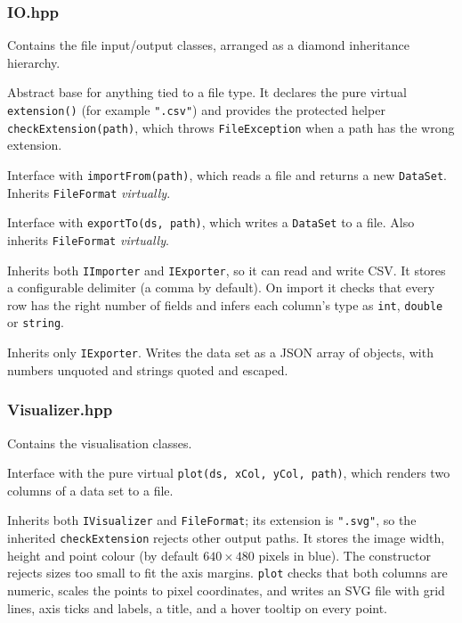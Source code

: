 \documentclass[11pt,a4paper]{article}
\newcommand{\code}[1]{\texttt{#1}}
\begin{document}
\subsubsection*{IO.hpp}

Contains the file input/output classes, arranged as a diamond inheritance hierarchy.

\begin{description}[noitemsep,leftmargin=1.5em]
  \item[\code{FileFormat}] Abstract base for anything tied to a file type. It declares the pure
    virtual \code{extension()} (for example \code{".csv"}) and provides the protected helper
    \code{checkExtension(path)}, which throws \code{FileException} when a path has the wrong
    extension.
  \item[\code{IImporter}] Interface with \code{importFrom(path)}, which reads a file and returns a
    new \code{DataSet}. Inherits \code{FileFormat} \emph{virtually}.
  \item[\code{IExporter}] Interface with \code{exportTo(ds, path)}, which writes a \code{DataSet}
    to a file. Also inherits \code{FileFormat} \emph{virtually}.
  \item[\code{CSVHandler}] Inherits both \code{IImporter} and \code{IExporter}, so it can read and
    write CSV. It stores a configurable delimiter (a comma by default). On import it checks that
    every row has the right number of fields and infers each column's type as \code{int},
    \code{double} or \code{string}.
  \item[\code{JSONExporter}] Inherits only \code{IExporter}. Writes the data set as a JSON array
    of objects, with numbers unquoted and strings quoted and escaped.
\end{description}

\subsubsection*{Visualizer.hpp}

Contains the visualisation classes.

\begin{description}[noitemsep,leftmargin=1.5em]
  \item[\code{IVisualizer}] Interface with the pure virtual \code{plot(ds, xCol, yCol, path)},
    which renders two columns of a data set to a file.
  \item[\code{ScatterPlot}] Inherits both \code{IVisualizer} and \code{FileFormat}; its extension is
    \code{".svg"}, so the inherited \code{checkExtension} rejects other output paths. It stores the
    image width, height and point colour (by default $640 \times 480$ pixels in blue). The
    constructor rejects sizes too small to fit the axis margins. \code{plot} checks that both
    columns are numeric, scales the points to pixel coordinates, and writes an SVG file with grid
    lines, axis ticks and labels, a title, and a hover tooltip on every point.
\end{description}
\end{document}
